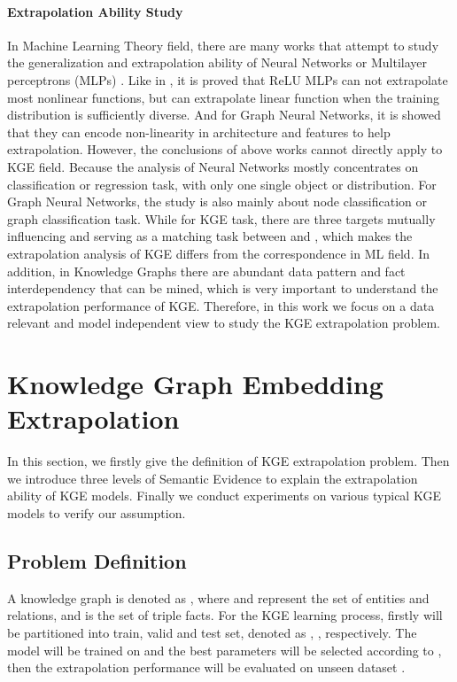 \documentclass[letterpaper]{article} \usepackage{aaai22}  \usepackage{times}  \usepackage{helvet}  \usepackage{courier}  \usepackage[hyphens]{url}  \usepackage{graphicx} \urlstyle{rm} \def\UrlFont{\rm}  \usepackage{natbib}  \usepackage{caption} \DeclareCaptionStyle{ruled}{labelfont=normalfont,labelsep=colon,strut=off} \frenchspacing  \setlength{\pdfpagewidth}{8.5in}  \setlength{\pdfpageheight}{11in}  \usepackage{algorithm}
\begin{document}
\paragraph{Extrapolation Ability Study}
In Machine Learning Theory field, there are many works that attempt to study the generalization and extrapolation ability of Neural Networks or Multilayer perceptrons (MLPs) \cite{IJCNN_1992_Haley_Extrapolation, CSM_1992_Barnard_Extrapolation, NeurIPS_2019_Bietti_Inductive, ICLR_2020_Ba_Generalization, ICLR_2021_Xu_NNExtrapolate}. Like in \cite{ICLR_2021_Xu_NNExtrapolate}, it is proved that ReLU MLPs can not extrapolate most nonlinear functions, but can extrapolate linear function when the training distribution is sufficiently diverse. And for Graph Neural Networks, it is showed that they can encode non-linearity in architecture and features to help extrapolation. However, the conclusions of above works cannot directly apply to KGE field. Because the analysis of Neural Networks mostly concentrates on classification or regression task, with only one single object or distribution. For Graph Neural Networks, the study is also mainly about node classification or graph classification task. While for KGE task, there are three targets  mutually influencing and serving as a matching task between  and , which makes the extrapolation analysis of KGE differs from the correspondence in ML field. In addition, in Knowledge Graphs there are abundant data pattern and fact interdependency that can be mined, which is very important to understand the extrapolation performance of KGE. Therefore, in this work we focus on a data relevant and model independent view to study the KGE extrapolation problem. 

\section{Knowledge Graph Embedding Extrapolation}
\label{sec: KGE Extrapolation}
In this section, we firstly give the definition of KGE extrapolation problem. Then we introduce three levels of Semantic Evidence to explain the extrapolation ability of KGE models. Finally we conduct experiments on various typical KGE models to verify our assumption.

\subsection{Problem Definition}
A knowledge graph is denoted as , where  and  represent the set of entities and relations, and  is the set of triple facts. For the KGE learning process, firstly  will be partitioned into train, valid and test set, denoted as , ,  respectively. The model will be trained on  and the best parameters will be selected according to , then the extrapolation performance will be evaluated on unseen dataset . 
\end{document}

